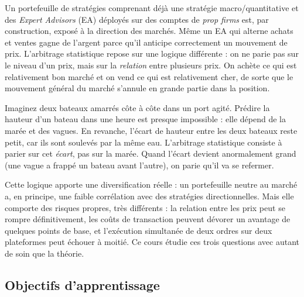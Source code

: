 \documentclass[11pt,a4paper]{article}
\begin{document}
Un portefeuille de stratégies comprenant déjà une stratégie macro/quantitative et des \emph{Expert Advisors} (EA) déployés sur des comptes de \emph{prop firms} est, par construction, exposé à la direction des marchés. Même un EA qui alterne achats et ventes gagne de l'argent parce qu'il anticipe correctement un mouvement de prix. L'arbitrage statistique repose sur une logique différente : on ne parie pas sur le niveau d'un prix, mais sur la \emph{relation} entre plusieurs prix. On achète ce qui est relativement bon marché et on vend ce qui est relativement cher, de sorte que le mouvement général du marché s'annule en grande partie dans la position.

\begin{intuition}
Imaginez deux bateaux amarrés côte à côte dans un port agité. Prédire la hauteur d'un bateau dans une heure est presque impossible : elle dépend de la marée et des vagues. En revanche, l'écart de hauteur entre les deux bateaux reste petit, car ils sont soulevés par la même eau. L'arbitrage statistique consiste à parier sur cet \emph{écart}, pas sur la marée. Quand l'écart devient anormalement grand (une vague a frappé un bateau avant l'autre), on parie qu'il va se refermer.
\end{intuition}

Cette logique apporte une diversification réelle : un portefeuille \og neutre au marché\fg{} a, en principe, une faible corrélation avec des stratégies directionnelles. Mais elle comporte des risques propres, très différents : la relation entre les prix peut se rompre définitivement, les coûts de transaction peuvent dévorer un avantage de quelques points de base, et l'exécution simultanée de deux ordres sur deux plateformes peut échouer à moitié. Ce cours étudie ces trois questions avec autant de soin que la théorie.

\subsection{Objectifs d'apprentissage}
\end{document}
